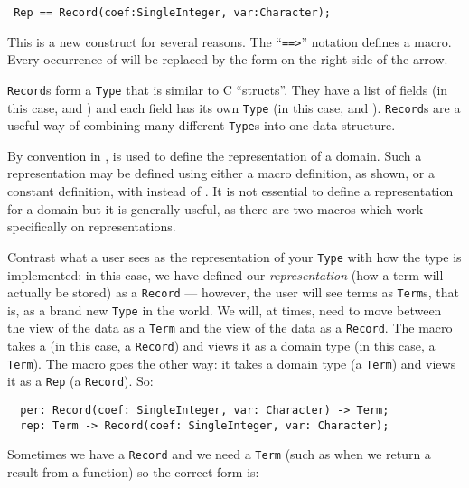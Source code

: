 \begin{small}
\begin{verbatim}
 Rep == Record(coef:SingleInteger, var:Character);
\end{verbatim}
\end{small}

This is a new construct for several reasons. The ``\verb+==>+'' notation
\keywordIndex{==>}
defines a macro. Every occurrence of  will be replaced by the
form on the right side of the arrow.  

\verb"Record"s form a \verb"Type" that is similar to C ``structs''.
They have a list of fields (in this case,  and )
and each field has its own \verb"Type" (in this case,
 and ). \verb"Record"s are a useful
way of combining many different \verb"Type"s into one data structure.

By convention in \asharp{},  is used to define the
representation of a domain. Such a  representation may be defined
using either a macro definition, as shown, or a constant definition,
with \ttin{==} instead of \ttin{==>}.  It is not essential to define
a representation for a domain but it is generally useful, as there are
two macros which work specifically on representations.

Contrast what a user sees as the representation of your \verb"Type"
with how the type is implemented: in this case, we have defined our
{\em representation\/} (how a term will actually be stored) as a
\verb"Record" --- however, the user will see terms as \verb"Term"s, that
is, as a brand new \verb"Type" in the world.
We will, at times, need to move between the view of the data as
a \verb"Term" and the view of the data as a \verb"Record".
The macro  takes a  (in this case, a \verb"Record")
and views it as a domain type (in this case, a \verb"Term").
The macro  goes the other way: it takes a domain type
(a \verb"Term") and views it as a \verb"Rep" (a \verb"Record"). So:

\begin{small}%
\begin{verbatim}
  per: Record(coef: SingleInteger, var: Character) -> Term;
  rep: Term -> Record(coef: SingleInteger, var: Character);
\end{verbatim}
\end{small}

Sometimes we have a \verb"Record" and we need a \verb"Term" (such as when we
return a result from a function) so the correct form is:

